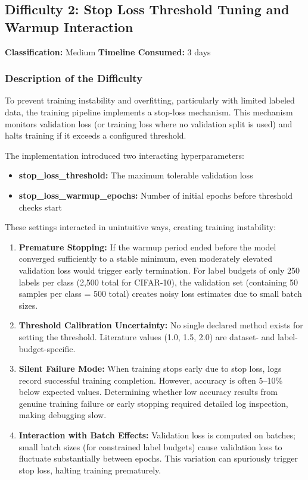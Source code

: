 \subsection{Difficulty 2: Stop Loss Threshold Tuning and Warmup Interaction}

\textbf{Classification:} Medium \quad \textbf{Timeline Consumed:} 3 days

\subsubsection{Description of the Difficulty}

To prevent training instability and overfitting, particularly with limited labeled data, the training pipeline implements a stop-loss mechanism. This mechanism monitors validation loss (or training loss where no validation split is used) and halts training if it exceeds a configured threshold.

The implementation introduced two interacting hyperparameters:
\begin{itemize}
    \item \textbf{stop\_loss\_threshold:} The maximum tolerable validation loss
    \item \textbf{stop\_loss\_warmup\_epochs:} Number of initial epochs before threshold checks start
\end{itemize}

These settings interacted in unintuitive ways, creating training instability:

\begin{enumerate}
    \item \textbf{Premature Stopping:} If the warmup period ended before the model converged sufficiently to a stable minimum, even moderately elevated validation loss would trigger early termination. For label budgets of only 250 labels per class (2,500 total for CIFAR-10), the validation set (containing 50 samples per class = 500 total) creates noisy loss estimates due to small batch sizes.

    \item \textbf{Threshold Calibration Uncertainty:} No single declared method exists for setting the threshold. Literature values (1.0, 1.5, 2.0) are dataset- and label-budget-specific.

    \item \textbf{Silent Failure Mode:} When training stops early due to stop loss, logs record successful training completion. However, accuracy is often 5--10\% below expected values. Determining whether low accuracy results from genuine training failure or early stopping required detailed log inspection, making debugging slow.

    \item \textbf{Interaction with Batch Effects:} Validation loss is computed on batches; small batch sizes (for constrained label budgets) cause validation loss to fluctuate substantially between epochs. This variation can spuriously trigger stop loss, halting training prematurely.
\end{enumerate}

